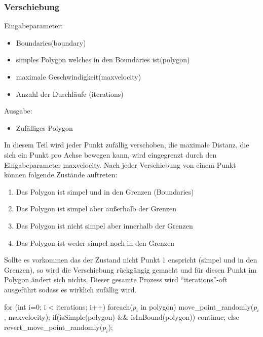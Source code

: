   \subsubsection{Verschiebung}
    Eingabeparameter: 
    \begin{itemize}
      \item Boundaries(boundary)
      \item simples Polygon welches in den Boundaries ist(polygon)
      \item maximale Geschwindigkeit(maxvelocity)
      \item Anzahl der Durchläufe (iterations)
    \end{itemize}
    Ausgabe:
    \begin{itemize}
      \item Zufälliges Polygon
    \end{itemize}
    In diesem Teil wird jeder Punkt zufällig verschoben, die maximale 
    Distanz, die sich ein Punkt pro Achse bewegen kann, wird eingegrenzt 
    durch den Eingabeparameter maxvelocity. Nach jeder Verschiebung von 
    einem Punkt können folgende Zustände auftreten:
    \begin{enumerate}
      \item Das Polygon ist simpel und in den Grenzen (Boundaries)
      \item Das Polygon ist simpel aber außerhalb der Grenzen
      \item Das Polygon ist nicht simpel aber innerhalb der Grenzen
      \item Das Polygon ist weder simpel noch in den Grenzen
    \end{enumerate}
    Sollte es vorkommen das der Zustand nicht Punkt 1 enspricht (simpel 
    und in den Grenzen), so wird die Verschiebung rückgängig gemacht und 
    für diesen Punkt im Polygon ändert sich nichts.
    Dieser gesamte Prozess wird \enquote{iterations}-oft ausgeführt sodass 
    es wirklich zufällig wird.

\begin{code}[caption={Pseudocode},mathescape=true]
for (int i=0; i < iterations; i++)
{
  foreach($p_i$ in polygon)
  {
    move_point_randomly($p_i$, maxvelocity);
    if(isSimple(polygon) && isInBound(polygon))
      continue;
    else
      revert_move_point_randomly($p_i$);
  }
}
\end{code}

